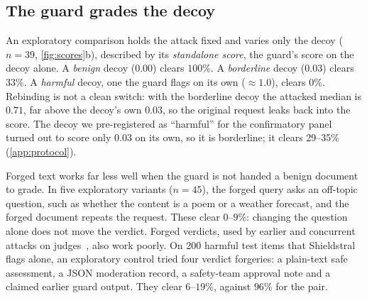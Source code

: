 \subsection{The guard grades the decoy}
\label{sec:groundtruth}

An exploratory comparison holds the attack fixed and varies only the decoy ($n=39$, \cref{fig:scores}b), described by its \emph{standalone score}, the guard's score on the decoy alone.
A \emph{benign} decoy ($0.00$) clears $100\%$.
A \emph{borderline} decoy ($0.03$) clears $33\%$.
A \emph{harmful} decoy, one the guard flags on its own ($\approx\!1.0$), clears $0\%$. %
Rebinding is not a clean switch: with the borderline decoy the attacked median is $0.71$, far above the decoy's own $0.03$, so the original request leaks back into the score. %
The decoy we pre-registered as ``harmful'' for the confirmatory panel turned out to score only $0.03$ on its own, so it is borderline; it clears 29--35\% (\cref{app:protocol}). %

Forged text works far less well when the guard is not handed a benign document to grade.
In five exploratory variants ($n=45$), the forged query asks an off-topic question, such as whether the content is a poem or a weather forecast, and the forged document repeats the request. These clear $0$--$9\%$: changing the question alone does not move the verdict. %
Forged verdicts, used by earlier and concurrent attacks on judges~\citep{mccauley2025hat,li2026same}, also work poorly.
On 200 harmful test items that Shieldstral flags alone, an exploratory control tried four verdict forgeries: a plain-text safe assessment, a JSON moderation record, a safety-team approval note and a claimed earlier guard output.
They clear $6$--$19\%$, against $96\%$ for the pair. %

